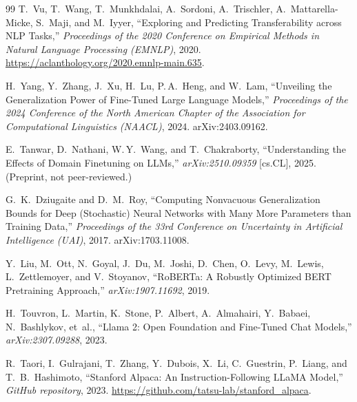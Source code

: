 \documentclass[11pt]{article}
\begin{document}
\begin{thebibliography}{99}
T.\ Vu, T.\ Wang, T.\ Munkhdalai, A.\ Sordoni, A.\ Trischler,
A.\ Mattarella-Micke, S.\ Maji, and M.\ Iyyer,
``Exploring and Predicting Transferability across NLP Tasks,''
\textit{Proceedings of the 2020 Conference on Empirical Methods in Natural
  Language Processing (EMNLP)}, 2020.
\url{https://aclanthology.org/2020.emnlp-main.635}.

H.\ Yang, Y.\ Zhang, J.\ Xu, H.\ Lu, P.\,A.\ Heng, and W.\ Lam,
``Unveiling the Generalization Power of Fine-Tuned Large Language Models,''
\textit{Proceedings of the 2024 Conference of the North American Chapter of the
  Association for Computational Linguistics (NAACL)}, 2024.
arXiv:2403.09162.

E.\ Tanwar, D.\ Nathani, W.\,Y.\ Wang, and T.\ Chakraborty,
``Understanding the Effects of Domain Finetuning on LLMs,''
\textit{arXiv:2510.09359} [cs.CL], 2025. (Preprint, not peer-reviewed.)

G.\ K.\ Dziugaite and D.\ M.\ Roy,
``Computing Nonvacuous Generalization Bounds for Deep (Stochastic) Neural
Networks with Many More Parameters than Training Data,''
\textit{Proceedings of the 33rd Conference on Uncertainty in Artificial
  Intelligence (UAI)}, 2017. arXiv:1703.11008.

Y.\ Liu, M.\ Ott, N.\ Goyal, J.\ Du, M.\ Joshi, D.\ Chen, O.\ Levy,
M.\ Lewis, L.\ Zettlemoyer, and V.\ Stoyanov,
``RoBERTa: A Robustly Optimized BERT Pretraining Approach,''
\textit{arXiv:1907.11692}, 2019.

H.\ Touvron, L.\ Martin, K.\ Stone, P.\ Albert, A.\ Almahairi, Y.\ Babaei,
N.\ Bashlykov, et~al.,
``Llama 2: Open Foundation and Fine-Tuned Chat Models,''
\textit{arXiv:2307.09288}, 2023.

R.\ Taori, I.\ Gulrajani, T.\ Zhang, Y.\ Dubois, X.\ Li, C.\ Guestrin,
P.\ Liang, and T.\ B.\ Hashimoto,
``Stanford Alpaca: An Instruction-Following LLaMA Model,''
\textit{GitHub repository}, 2023.
\url{https://github.com/tatsu-lab/stanford_alpaca}.

\end{thebibliography}
\end{document}
